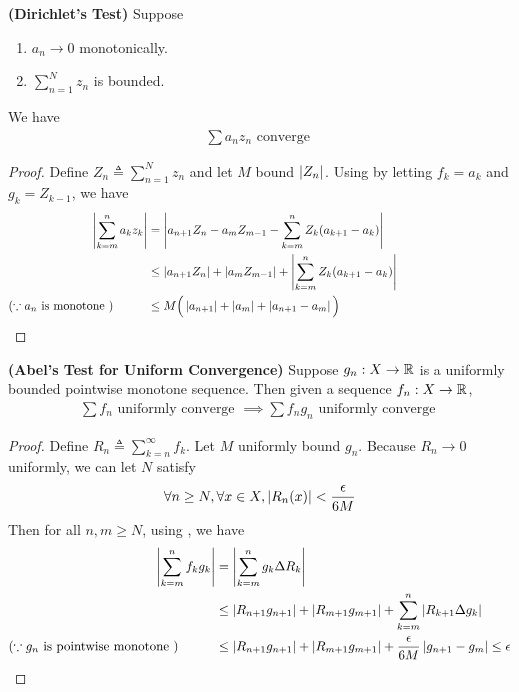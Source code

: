 \documentclass{report}
\begin{document}
\begin{theorem}
\label{Dirichlet's Test}
\textbf{(Dirichlet's Test)} Suppose 
\begin{enumerate}[label=(\alph*)]
  \item $a_n\to 0$ monotonically. 
  \item $\sum_{n=1}^N z_n$ is bounded.
\end{enumerate}
We have 
\begin{align*}
\sum a_nz_n\text{ converge }
\end{align*}
\end{theorem}
\begin{proof}
Define $Z_n\triangleq \sum_{n=1}^N z_n$ and let $M$ bound  $\left|Z_n\right|$. Using  by letting $f_k=a_k$ and $g_k=Z_{k-1}$, we have
\begin{align*}
  \abso{\sum_{k=m}^{n}a_kz_k}&= \abso{a_{n+1}Z_n- a_mZ_{m-1}- \sum_{k=m}^n Z_k(a_{k+1}-a_k)}\\
                             &\leq \abso{a_{n+1}Z_n}+ \abso{a_mZ_{m-1}}+ \abso{\sum_{k=m}^n Z_k (a_{k+1}-a_k)}\\
  (\because a_n\text{ is monotone })\hspace{1cm}&\leq M\Big(\abso{a_{n+1}}+\abso{a_{m}}+\abso{a_{n+1}-a_m} \Big)\hspace{5cm}
\end{align*}
\end{proof}
\begin{theorem}
\label{Abel's Test for Uniform Convergence}
\textbf{(Abel's Test for Uniform Convergence)} Suppose $g_n:X\rightarrow \mathbb{R}$ is a uniformly bounded pointwise monotone sequence. Then given a sequence $f_n:X\rightarrow \mathbb{R}$, 
\begin{align*}
\sum f_n\text{ uniformly converge }\implies \sum f_ng_n\text{ uniformly converge }
\end{align*}
\end{theorem}
\begin{proof}
Define $R_n\triangleq \sum_{k=n}^{\infty}f_k$. Let $M$ uniformly bound $g_n$. Because $R_n\to 0$ uniformly, we can let $N$ satisfy 
 \begin{align*}
\forall n\geq N, \forall x\in X,\left|R_n(x)\right|<\frac{\epsilon}{6M} 
\end{align*}
Then for all $n,m\geq N$, using , we have
\begin{align*}
  \left|\sum_{k=m}^{n}f_kg_k\right|&=\left|\sum_{k=m}^n g_k\Delta R_k \right|\\
  &\leq \left|R_{n+1}g_{n+1}\right|+ \left|R_{m+1}g_{m+1}\right|+ \sum_{k=m}^n\left| R_{k+1}\Delta g_k\right| \\
  (\because g_n\text{ is pointwise monotone })\hspace{1cm}&\leq \left|R_{n+1}g_{n+1}\right|+ \left|R_{m+1}g_{m+1}\right|+ \frac{\epsilon }{6M} \left|g_{n+1}-g_m\right|\leq \epsilon 
\end{align*}
\end{proof}
\end{document}
